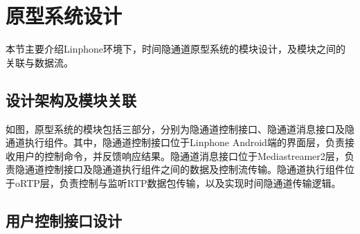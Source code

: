 \section{原型系统设计}
\label{chap:linphone:designation}

本节主要介绍Linphone环境下，时间隐通道原型系统的模块设计，及模块之间的关联与数据流。

\subsection{设计架构及模块关联}
\label{chap:linphone:designation:struct}


如图，原型系统的模块包括三部分，分别为隐通道控制接口、隐通道消息接口及隐通道执行组件。其中，隐通道控制接口位于Linphone Android端的界面层，负责接收用户的控制命令，并反馈响应结果。隐通道消息接口位于Mediastreamer2层，负责隐通道控制接口及隐通道执行组件之间的数据及控制流传输。隐通道执行组件位于oRTP层，负责控制与监听RTP数据包传输，以及实现时间隐通道传输逻辑。

\subsection{用户控制接口设计}
\label{chap:linphone:designation:ui}

